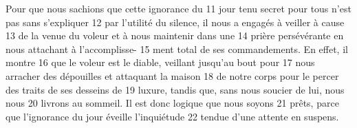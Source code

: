 Pour que nous sachions que cette ignorance du	 
11	 	jour tenu secret pour tous n'est pas sans s'expliquer	 
12	 	par l'utilité du silence, il nous a engagés à veiller à cause	 
13	 	de la venue du voleur et à nous maintenir dans une	 
14	 	prière persévérante en nous attachant à l'accomplisse-	 
15	 	ment total de ses commandements. En effet, il montre	 
16	 	que le voleur est le diable, veillant jusqu'au bout pour	 
17	 	nous arracher des dépouilles et attaquant la maison	 
18	 	de notre corps pour le percer des traits de ses desseins de	 
19	 	luxure, tandis que, sans nous soucier de lui, nous nous	 
20	 	livrons au sommeil. Il est donc logique que nous soyons	 
21	 	prêts, parce que l'ignorance du jour éveille l'inquiétude	 
22	 	tendue d'une attente en suspens.